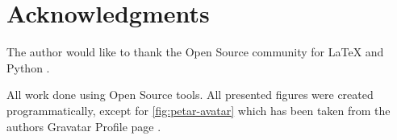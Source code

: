 \section*{Acknowledgments}

The author would like to thank the Open Source community for \LaTeX \cite{LaTeX} and Python \cite{Python}.

All work done using Open Source tools.
All presented figures were created programmatically, except for \cref{fig:petar-avatar} which has been taken from the authors Gravatar Profile page \cite{Maric:Gravatar}.
